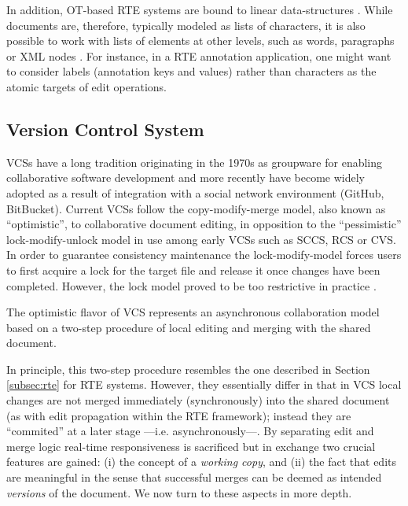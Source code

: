 \documentclass{sig-alternate}
\begin{document}

In addition, OT-based RTE systems are bound to linear data-structures \cite{Imine2009}.
While documents are, therefore, typically modeled as lists of characters, it is also possible to work
with lists of elements at other levels, such as words, paragraphs or XML nodes \cite{SuClarence}.
For instance, in a RTE annotation application, one might want to consider labels (annotation keys
and values) rather than characters as the atomic targets of edit operations.


\subsection{Version Control System}\label{subsec:vcs}

VCSs have a long tradition originating in the 1970s as groupware for enabling collaborative
software development and more recently have become widely adopted as a result of
integration with a social network environment (GitHub, BitBucket).
Current VCSs follow the copy-modify-merge model, also known as ``optimistic'', to
collaborative document editing, in opposition to the ``pessimistic'' lock-modify-unlock model
in use among early VCSs such as SCCS, RCS or CVS.
In order to guarantee consistency maintenance the lock-modify-model forces users to first
acquire a lock for the target file and release it once changes have been completed. However, 
the lock model proved to be too restrictive in practice \cite{Loeliger2012}.

The optimistic flavor of VCS represents an asynchronous collaboration model based on a
two-step procedure of local editing and merging with the shared document.

In principle, this two-step procedure resembles the one described in Section \ref{subsec:rte}
for RTE systems. However, they essentially differ in that in VCS local changes are not merged
immediately (synchronously) into the shared document (as with edit propagation
within the RTE framework); instead they are ``commited'' at a later stage ---i.e. asynchronously---.
By separating edit and merge logic real-time responsiveness is
sacrificed but in exchange two crucial features are gained: (i) the concept of a
\textit{working copy}, and (ii) the fact that edits are meaningful in the sense
that successful merges can be deemed as intended \textit{versions} of the document.
We now turn to these aspects in more depth.
\end{document}
